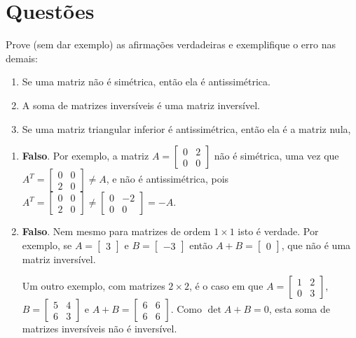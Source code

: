 \documentclass[12pt,a4paper]{article}
\begin{document}
\section*{Questões}
\begin{ExerciseList}

\Exercise[title={2,0}] Prove (sem dar exemplo) as afirmações verdadeiras e exemplifique o erro nas demais:
\begin{enumerate}
\item Se uma matriz não é simétrica, então ela é antissimétrica.
\item A soma de matrizes inversíveis é uma matriz inversível.
\item Se uma matriz triangular inferior é antissimétrica, então ela é a matriz nula,
\end{enumerate}
\Answer
\begin{enumerate}
\item \textbf{Falso}. Por exemplo, a matriz $A=
\begin{bmatrix}
0 & 2 \\
0 & 0
\end{bmatrix}
$ não é simétrica, uma vez que $A^T
= \begin{bmatrix}
0 & 0 \\
2 & 0
\end{bmatrix}
\neq
A$, e não é antissimétrica, pois $A^T = \begin{bmatrix}
0 & 0 \\
2 & 0
\end{bmatrix}
\neq
\begin{bmatrix}
0 & -2 \\
0 & 0
\end{bmatrix}
= -A$.

\item \textbf{Falso}. Nem mesmo para matrizes de ordem $1 \times 1$ isto é verdade. Por exemplo, se $A = \begin{bmatrix} 3 \end{bmatrix}$ e $B = \begin{bmatrix} -3 \end{bmatrix}$ então $A + B = \begin{bmatrix} 0 \end{bmatrix}$, que não é uma matriz inversível.

Um outro exemplo, com matrizes $2 \times 2$, é o caso em que $A = \begin{bmatrix} 1 & 2 \\ 0 & 3 \end{bmatrix}$, $B = \begin{bmatrix} 5 & 4 \\ 6 & 3 \end{bmatrix}$ e $A + B = \begin{bmatrix} 6 & 6 \\ 6 & 6 \end{bmatrix}$. Como $\det{A+B} = 0$, esta soma de matrizes inversíveis não é inversível.


\end{enumerate}
\end{ExerciseList}
\end{document}
